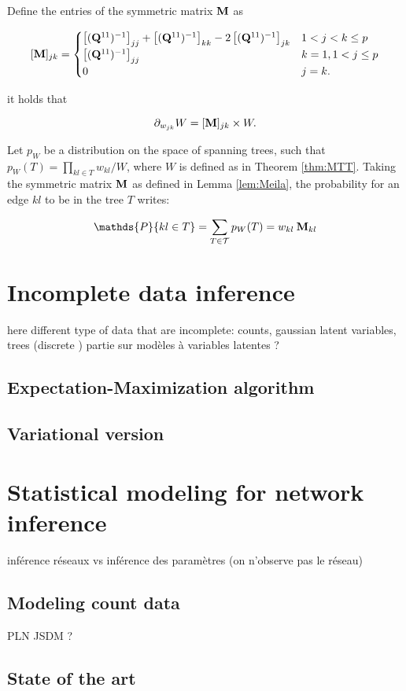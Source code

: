 \begin{lemma}  \label{lem:Meila}
    Define the entries of the symmetric matrix ${\bf M}$ as
 
\[    
 [{\bf M}]_{jk} =\begin{cases}
    \left[({\bf Q}^{11})^{-1}\right]_{jj} + \left[({\bf Q}^{11})^{-1}\right]_{kk} -2\left[({\bf Q}^{11})^{-1}\right]_{jk} & 1< j<k \leq p\\
    \left[({\bf Q}^{11})^{-1}\right]_{jj} & k=1, 1< j \leq p  \\
    0 &  j=k .
    \end{cases}
\]
 
it holds that
 
$$
\partial_{w_{jk}} W = [{\bf M}]_{jk}  \times W.
$$
\end{lemma}
\begin{lemma}  \label{lem:Kirshner}
    Let $p_W$ be a distribution on the space of spanning trees, such that $p_W(T)=\prod_{kl\in T} w_{kl} / W$, where $W$ is defined as in Theorem \ref{thm:MTT}. Taking the symmetric matrix ${\bf M}$ as defined in Lemma  \ref{lem:Meila}, the probability for an edge $kl$ to be in the tree $T$ writes:
 
$$\mathds{P}\{kl\in T\} = \sum_{T\in \mathcal{T}} p_W(T)= w_{kl}\: \Mbf_{kl}$$
\end{lemma}

  \section{Incomplete data inference}
  here different type of data that are incomplete: counts, gaussian latent variables, trees (discrete )
  partie sur modèles à variables latentes ?

 \subsection{Expectation-Maximization algorithm}
 
 \subsection{Variational version}
  
\section{Statistical modeling for network inference}
  inférence réseaux vs inférence des paramètres (on n'observe pas le réseau)
 \subsection{Modeling count data}
PLN
 JSDM ?
\subsection{State of the art}
 